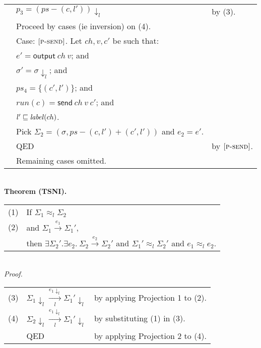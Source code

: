 \documentclass{article}
\newcommand{\rn}[1]{\text{\textsc{[#1]}}}
\newcommand{\ssteparrow}[1]{\overset{#1}{\longrightarrow}}
\newcommand{\sstep}[3]{#2\ssteparrow{#1}#3}
\newcommand{\lssteparrow}[2]{\overset{#2}{\underset{#1}{\longrightarrow}}}
\newcommand{\lsstep}[4]{#3\lssteparrow{#1}{#2}#4}
\newcommand{\s}[1]{\text{\textit{#1}}}
\newcommand{\process}[2]{(#1,#2)}
\newcommand{\opsend}[3]{\textsf{send}~#1~#2~#3}
\newcommand{\evsend}[2]{\textsf{output}~#1~#2}
\newcommand{\proj}[2]{#1{\downarrow_{#2}}}
\newcommand{\lequiv}[3]{#2\approx_{#1}#3}
\begin{document}
\begin{tabular}{l@{$\qquad$}l@{\qquad}l}
        & $p_3 = \proj{(ps-\process{c}{l'})}{l}$
        & by (3).
\\
        & Proceed by cases (ie inversion) on (4).
\\
        & Case: $\rn{p-send}$. Let $ch,v,c'$ be such that:
\\
        & \z $e'=\evsend{ch}{v}$; and
\\
        & \z $\sigma'=\proj{\sigma}{l}$; and
\\
        & \z $ps_4=\{\process{c'}{l'}\}$; and
\\
        & \z $run(c)=\opsend{ch}{v}{c'}$; and
\\
        & \z $l'\sqsubseteq\s{label}(ch)$.
\\
        & \z Pick $\Sigma_2 = (\sigma, ps-\process{c}{l'}+\process{c'}{l'})$ and $e_2=e'$.
\\
        & \z QED
        & by $\rn{p-send}$.
\\
        & Remaining cases omitted.
\end{tabular}
\\
\textbf{Theorem (TSNI).}
\\
\begin{tabular}{l@{$\qquad$}l}
  (1) & If $\lequiv{l}{\Sigma_1}{\Sigma_2}$
\\
  (2) & and $\sstep{e_1}{\Sigma_1}{\Sigma_1'}$,
\\
      & then $\exists \Sigma_2'.\exists e_2.~\sstep{e_2}{\Sigma_2}{\Sigma_2'}$
        and $\lequiv{l}{\Sigma_1'}{\Sigma_2'}$
        and $\lequiv{l}{e_1}{e_2}$.
\end{tabular}
\\
\textit{Proof.}
\\
\begin{tabular}{l@{$\qquad$}l@{\qquad}l}
  (3) & $\lsstep{l}{\proj{e_1}{l}}{\proj{\Sigma_1}{l}}{\proj{\Sigma_1'}{l}}$
      & by applying Projection 1 to (2).
\\
  (4) & $\lsstep{l}{\proj{e_1}{l}}{\proj{\Sigma_2}{l}}{\proj{\Sigma_1'}{l}}$
      & by substituting (1) in (3).
\\
      & QED
      & by applying Projection 2 to (4).
\end{tabular}
\end{document}
